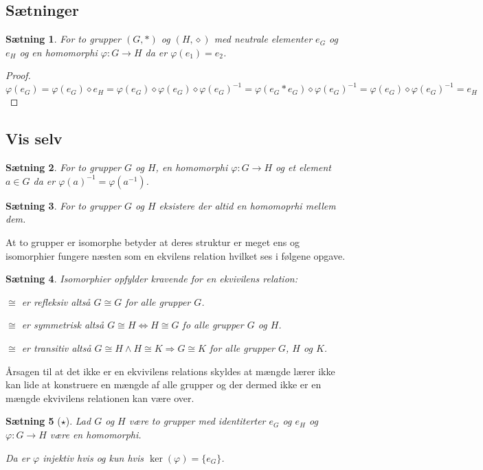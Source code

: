 \documentclass{article}
\newcommand{\inv}{^{-1}}
\newcommand{\imp}{\Rightarrow}
\newcommand{\biimp}{\Leftrightarrow}
\newcommand{\too}{\rightarrow}
\newtheorem{setn}{Sætning}
\begin{document}
		\subsection*{Sætninger}
		\begin{setn}
			For to grupper $(G,*)$ og $(H, \diamond)$ med neutrale elementer $e_G$ og $e_H$
			og en homomorphi $\varphi: G \too H$ da er $\varphi(e_1) = e_2$.
		\end{setn}
		\begin{proof}
			$$\varphi(e_G) = \varphi(e_G)\diamond e_H
			= \varphi(e_G)\diamond\varphi(e_G)\diamond\varphi(e_G)\inv
			= \varphi(e_G*e_G)\diamond\varphi(e_G)\inv
			= \varphi(e_G)\diamond\varphi(e_G)\inv = e_H$$
		\end{proof}
		\subsection*{Vis selv}
		\begin{setn}
			For to grupper $G$ og $H$, en homomorphi $\varphi: G \too H$
			og et element $a \in G$ da er $\varphi(a)\inv = \varphi(a\inv)$.
		\end{setn}
		\begin{setn}
			For to grupper $G$ og $H$ eksistere der altid en homomoprhi mellem dem.
		\end{setn}
		At to grupper er isomorphe betyder at deres struktur er meget ens og isomorphier
		fungere næsten som en ekvilens relation hvilket ses i følgene opgave.
		\begin{setn}
			Isomorphier opfylder kravende for en ekvivilens relation:

			$\cong$ er refleksiv altså $G \cong G$ for alle grupper $G$.

			$\cong$ er symmetrisk altså $G \cong H \biimp H \cong G$ fo alle grupper $G$ og $H$.

			$\cong$ er transitiv altså $G \cong H \wedge H \cong K \imp G \cong K$
			for alle grupper $G$, $H$ og $K$.

		\end{setn}
		Årsagen til at det ikke er en ekvivilens relations skyldes at mængde lærer ikke
		kan lide at konstruere en mængde af alle grupper og der dermed ikke er en mængde
		ekvivilens relationen kan være over.
		\begin{setn}[$\star$]
			Lad $G$ og $H$ være to grupper med identiterter $e_G$ og $e_H$
			og $\varphi: G \too H$ være en homomorphi.

			Da er $\varphi$ injektiv hvis og kun hvis $\ker(\varphi) = \{e_G\}$.
		\end{setn}
\end{document}

